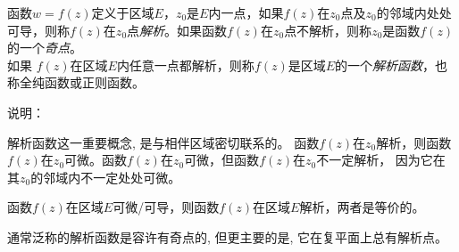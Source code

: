 \begin{definition}\label{}\index{}
函数$w = f(z)$定义于区域$E$，$z_0$是$E$内一点，如果$f(z)$在$z_0$点及$z_0$的邻域内处处可导，则称$f(z)$在$z_0$点\emph{解析}。如果函数$f(z)$在$z_0$点不解析，则称$z_0$是函数$f(z)$的一个\emph{奇点}。\\
如果 $f(z)$在区域$E$内任意一点都解析，则称$f(z)$是区域$E$的一个\emph{解析函数}，也称全纯函数或正则函数。
\end{definition}
说明：
\begin{compactitem}
    \item 解析函数这一重要概念, 是与相伴区域密切联系的。 函数$f(z)$在$z_0$解析，则函数$f(z)$在$z_0$可微。函数$f(z)$在$z_0$可微，但函数$f(z)$在$z_0$不一定解析， 因为它在其$z_0$的邻域内不一定处处可微。
    \item 函数$f(z)$在区域$E$可微/可导，则函数$f(z)$在区域$E$解析，两者是等价的。
    \item 通常泛称的解析函数是容许有奇点的, 但更主要的是, 它在复平面上总有解析点。
\end{compactitem}

